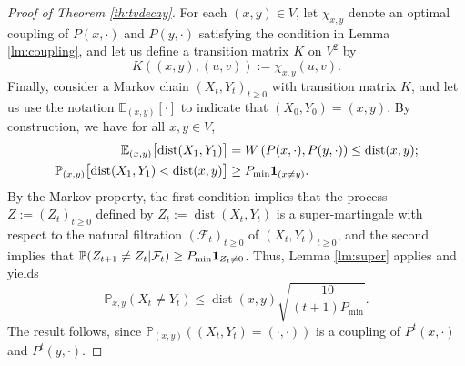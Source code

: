 \documentclass[10pt]{amsart}
\theoremstyle{definition}
\newcommand{\EE}{{\mathbb{E}}}
\newcommand{\PP}{{\mathbb{P}}}
\newcommand{\cF}{\mathcal {F}}
\newcommand{\pmin}{P_{\mathrm{min}}}
\DeclareMathOperator{\dist}{dist}
\begin{document}
\begin{proof}[Proof of Theorem \ref{th:tvdecay}]For each $(x,y)\in V$, let $\chi_{x,y}$ denote an optimal coupling of $P(x,\cdot)$ and $P(y,\cdot)$ satisfying the condition in Lemma \ref{lm:coupling}, and let us define a transition matrix $K$ on $V^2$ by
\begin{equation*}
K((x,y),(u,v)) := \chi_{x,y}(u,v).
\end{equation*}
Finally, consider a Markov chain $(X_t,Y_t)_{t\ge 0}$ with transition matrix $K$, and let us use the notation $\EE_{(x,y)}[\cdot]$ to indicate that $(X_0,Y_0)=(x,y)$. By construction, we have for all $x,y\in V$,
\begin{align*}
\EE_{(x,y)} \bigl[\dist(X_{1},Y_{1}) \bigr] & = W\left(P(x,\cdot),P(y,\cdot)\right)\le \dist(x,y);\\
\PP_{(x,y)}\bigl[\dist(X_1,Y_1)<\dist(x,y)\bigr] & \ge \pmin{\bf 1}_{(x\ne y)}.
\end{align*}
By the Markov property, the first condition implies that the process $Z:=(Z_t)_{t\ge 0}$ defined by
$
Z_t := \dist(X_t,Y_t)
$
is a super-martingale with respect to the natural filtration $(\cF_t)_{t\ge 0}$ of $(X_t,Y_t)_{t\ge 0}$, and the second implies that $\PP(Z_{t+1}\ne Z_t|\cF_t)\ge\pmin{\bf 1}_{Z_t\ne 0}$. Thus, Lemma \ref{lm:super} applies and yields
\begin{equation*}
\PP_{x,y}(X_t\ne Y_t) \le \dist(x,y)\sqrt{\frac{10}{ (t+1)\pmin}}.
\end{equation*}
The result follows, since $\PP_{(x,y)}\left((X_t,Y_t)=(\cdot,\cdot)\right)$ is a coupling of $P^t(x,\cdot)$ and $P^t(y,\cdot)$.
\end{proof}
\end{document}
